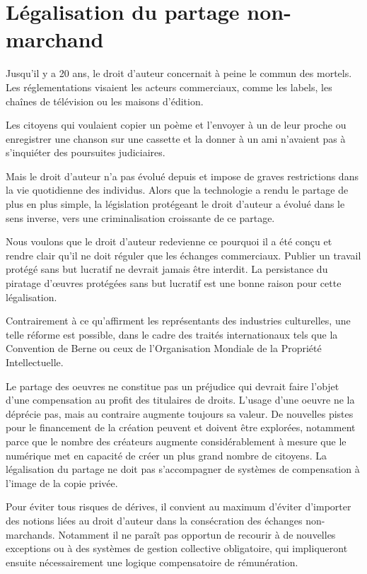 \chapter{Légalisation du partage non-marchand}\label{depen}

Jusqu’il y a 20 ans, le droit d’auteur concernait à peine le commun des mortels. Les réglementations visaient les acteurs commerciaux, comme les labels, les chaînes de télévision ou les maisons d’édition.

Les citoyens qui voulaient copier un poème et l’envoyer à un de leur proche ou enregistrer une chanson
sur une cassette et la donner à un ami n’avaient pas à s’inquiéter des poursuites judiciaires.

Mais le droit d'auteur n'a pas évolué depuis et impose de graves restrictions dans
la vie quotidienne des individus. Alors que la technologie a rendu le partage de plus en plus
simple, la législation protégeant le droit d'auteur a évolué dans le sens inverse, vers une criminalisation croissante de ce
partage.

\begin{mesure}
 Nous voulons que le droit d’auteur redevienne ce pourquoi il a été conçu et rendre clair qu’il ne
doit réguler que les échanges commerciaux. Publier un travail protégé sans but lucratif
ne devrait jamais être interdit. La persistance du piratage d'œuvres protégées sans but lucratif est une bonne raison pour cette
légalisation.
\end{mesure}

Contrairement à ce qu'affirment les représentants des industries culturelles, une telle réforme est possible, dans le cadre des traités internationaux tels que la Convention de Berne ou ceux de l’Organisation Mondiale de la Propriété Intellectuelle.

Le partage des oeuvres ne constitue pas un préjudice qui devrait faire l'objet d'une compensation au profit des titulaires de droits. L'usage d'une oeuvre ne la déprécie pas, mais au contraire augmente toujours sa valeur. De nouvelles pistes pour le financement de la création peuvent et doivent être explorées, notamment parce que le nombre des créateurs augmente considérablement à mesure que le numérique met en capacité de créer un plus grand nombre de citoyens. La légalisation du partage ne doit pas s'accompagner de systèmes de compensation à l'image de la copie privée. 

Pour éviter tous risques de dérives, il convient au maximum d'éviter d'importer des notions liées au droit d'auteur dans la consécration des échanges non-marchands. Notamment il ne paraît pas opportun de recourir à de nouvelles exceptions ou à des systèmes de gestion collective obligatoire, qui impliqueront ensuite nécessairement une logique compensatoire de rémunération. 

